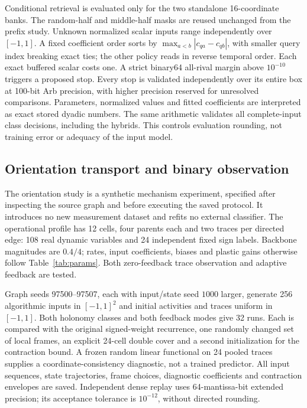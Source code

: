 \documentclass[11pt,a4paper]{article}
\theoremstyle{definition}\newtheorem{definition}[theorem]{Definition}
\begin{document}
Conditional retrieval is evaluated only for the two standalone 16-coordinate banks. The random-half and middle-half masks are reused unchanged from the prefix study. Unknown normalized scalar inputs range independently over $[-1,1]$. A fixed coefficient order sorts by $\max_{a<b}|c_{qa}-c_{qb}|$, with smaller query index breaking exact ties; the other policy reads in reverse temporal order. Each exact buffered scalar costs one. A strict binary64 all-rival margin above $10^{-10}$ triggers a proposed stop. Every stop is validated independently over its entire box at 100-bit Arb precision, with higher precision reserved for unresolved comparisons. Parameters, normalized values and fitted coefficients are interpreted as exact stored dyadic numbers. The same arithmetic validates all complete-input class decisions, including the hybrids. This controls evaluation rounding, not training error or adequacy of the input model.

\subsection{Orientation transport and binary observation}\label{sec:orientationprotocol}
The orientation study is a synthetic mechanism experiment, specified after inspecting the source graph and before executing the saved protocol. It introduces no new measurement dataset and refits no external classifier. The operational profile has 12 cells, four parents each and two traces per directed edge: 108 real dynamic variables and 24 independent fixed sign labels. Backbone magnitudes are $0.4/4$; rates, input coefficients, biases and plastic gains otherwise follow Table~\ref{tab:params}. Both zero-feedback trace observation and adaptive feedback are tested.

Graph seeds 97500--97507, each with input/state seed $1000$ larger, generate 256 algorithmic inputs in $[-1,1]^2$ and initial activities and traces uniform in $[-1,1]$. Both holonomy classes and both feedback modes give 32 runs. Each is compared with the original signed-weight recurrence, one randomly changed set of local frames, an explicit 24-cell double cover and a second initialization for the contraction bound. A frozen random linear functional on 24 pooled traces supplies a coordinate-consistency diagnostic, not a trained predictor. All input sequences, state trajectories, frame choices, diagnostic coefficients and contraction envelopes are saved. Independent dense replay uses 64-mantissa-bit extended precision; its acceptance tolerance is $10^{-12}$, without directed rounding.
\end{document}
